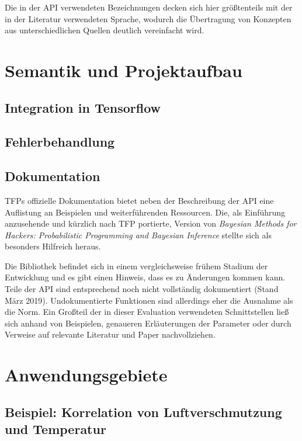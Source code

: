 \documentclass[12pt]{article}
\begin{document}
Die in der API verwendeten Bezeichnungen decken sich hier größtenteils mit der in der Literatur verwendeten Sprache, wodurch die Übertragung von Konzepten aus unterschiedlichen Quellen deutlich vereinfacht wird. 


\section{Semantik und Projektaufbau}

\subsection{Integration in Tensorflow}

\subsection{Fehlerbehandlung}

\subsection{Dokumentation}
TFPs offizielle Dokumentation bietet neben der Beschreibung der API eine Auflistung an Beispielen und weiterführenden Ressourcen. Die, als Einführung anzusehende und kürzlich nach TFP portierte, Version von \textit{Bayesian Methods for Hackers: Probabilistic Programming and Bayesian Inference}\cite{Davidson-Pilon2015} stellte sich als besonders Hilfreich heraus.

Die Bibliothek befindet sich in einem vergleichsweise frühem Stadium der Entwicklung und es gibt einen Hinweis, dass es zu Änderungen kommen kann. Teile der API sind entsprechend noch nicht vollständig dokumentiert (Stand März 2019).
Undokumentierte Funktionen sind allerdings eher die Ausnahme als die Norm. Ein Großteil der in dieser Evaluation verwendeten Schnittstellen ließ sich anhand von Beispielen, genaueren Erläuterungen der Parameter oder durch Verweise auf relevante Literatur und Paper nachvollziehen.

\section{Anwendungsgebiete}
\subsection{Beispiel: Korrelation von Luftverschmutzung und Temperatur}
\label{sec:example_air_quality}
\end{document}
